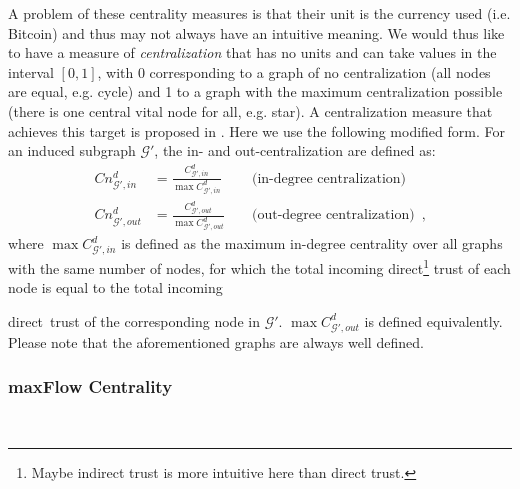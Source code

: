     A problem of these centrality measures is that their unit is the currency used (i.e. Bitcoin) and thus may not always have
    an intuitive meaning. We would thus like to have a measure of \textit{centralization} that has no units and can take
    values in the interval $\left[0,1\right]$, with 0 corresponding to a graph of no centralization (all nodes are equal,
    e.g.  cycle) and 1 to a graph with the maximum centralization possible (there is one central vital node for all, e.g.
    star). A centralization measure that achieves this target is proposed in \cite{freeman}. Here we use the following
    modified form. For an induced subgraph $\mathcal{G}'$, the in- and out-centralization are defined as:
    \begin{align*}
      Cn^d_{\mathcal{G}', in} &= \frac{C^d_{\mathcal{G}', in}}{\max C^d_{\mathcal{G}', in}} && \mbox{ (in-degree
      centralization)} \\
      Cn^d_{\mathcal{G}', out} &= \frac{C^d_{\mathcal{G}', out}}{\max C^d_{\mathcal{G}', out}} && \mbox{ (out-degree
      centralization)} \enspace,
    \end{align*}
    where $\max C^d_{\mathcal{G}', in}$ is defined as the maximum in-degree centrality over all graphs with the same number of
    nodes, for which the total incoming direct\footnote{Maybe indirect trust is more intuitive here than direct trust.} trust
    of each node is equal to the total incoming \addtocounter{footnote}{-1}direct\footnotemark \ trust of the corresponding
    node in $\mathcal{G}'$. $\max C^d_{\mathcal{G}', out}$ is defined equivalently. Please note that the aforementioned graphs
    are always well defined.

  \subsubsection{maxFlow Centrality} \ \\


